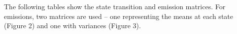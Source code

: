 \documentclass[english]{article}
\numberwithin{equation}{section}
\DeclarePairedDelimiter\paren{(}{)}           %
\DeclarePairedDelimiter\bkt{[}{]}             %
\begin{document}
	The following tables show the state transition and emission matrices. For emissions, two matrices are used -- one representing the means at each state (Figure 2) and one with variances (Figure 3).
%	
%	
%	
%	
%	
%	
%	
%	
	
	
	
\end{document}
